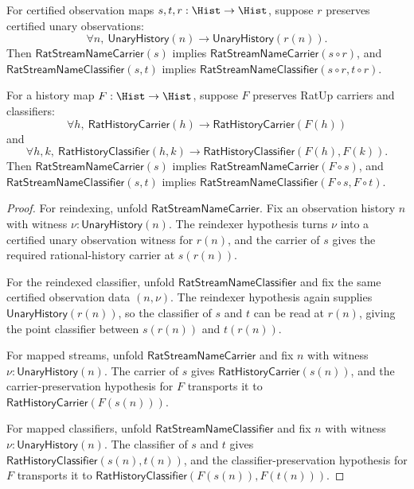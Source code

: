 \begin{theorem}
\label{thm:rat-stream-name-reindexing-and-map-stability}
For certified observation maps $s,t,r:\Hist\to\Hist$, suppose $r$ preserves
certified unary observations:
$$
\forall n,\ \mathsf{UnaryHistory}(n)\to\mathsf{UnaryHistory}(r(n)).
$$
Then $\mathsf{RatStreamNameCarrier}(s)$ implies
$\mathsf{RatStreamNameCarrier}(s\circ r)$, and
$\mathsf{RatStreamNameClassifier}(s,t)$ implies
$\mathsf{RatStreamNameClassifier}(s\circ r,t\circ r)$.

For a history map $F:\Hist\to\Hist$, suppose $F$ preserves RatUp carriers and
classifiers:
$$
\forall h,\ \mathsf{RatHistoryCarrier}(h)\to
\mathsf{RatHistoryCarrier}(F(h))
$$
and
$$
\forall h,k,\ \mathsf{RatHistoryClassifier}(h,k)\to
\mathsf{RatHistoryClassifier}(F(h),F(k)).
$$
Then $\mathsf{RatStreamNameCarrier}(s)$ implies
$\mathsf{RatStreamNameCarrier}(F\circ s)$, and
$\mathsf{RatStreamNameClassifier}(s,t)$ implies
$\mathsf{RatStreamNameClassifier}(F\circ s,F\circ t)$.
\end{theorem}
\begin{proof}
For reindexing, unfold $\mathsf{RatStreamNameCarrier}$. Fix an observation
history $n$ with witness $\nu:\mathsf{UnaryHistory}(n)$. The reindexer
hypothesis turns $\nu$ into a certified unary observation witness for $r(n)$,
and the carrier of $s$ gives the required rational-history carrier at
$s(r(n))$.

For the reindexed classifier, unfold
$\mathsf{RatStreamNameClassifier}$ and fix the same certified observation
data $(n,\nu)$. The reindexer hypothesis again supplies
$\mathsf{UnaryHistory}(r(n))$, so the classifier of $s$ and $t$ can be read at
$r(n)$, giving the point classifier between $s(r(n))$ and $t(r(n))$.

For mapped streams, unfold $\mathsf{RatStreamNameCarrier}$ and fix
$n$ with witness $\nu:\mathsf{UnaryHistory}(n)$. The carrier of $s$ gives
$\mathsf{RatHistoryCarrier}(s(n))$, and the carrier-preservation hypothesis
for $F$ transports it to $\mathsf{RatHistoryCarrier}(F(s(n)))$.

For mapped classifiers, unfold $\mathsf{RatStreamNameClassifier}$ and fix
$n$ with witness $\nu:\mathsf{UnaryHistory}(n)$. The classifier of $s$ and
$t$ gives $\mathsf{RatHistoryClassifier}(s(n),t(n))$, and the
classifier-preservation hypothesis for $F$ transports it to
$\mathsf{RatHistoryClassifier}(F(s(n)),F(t(n)))$.
\end{proof}

